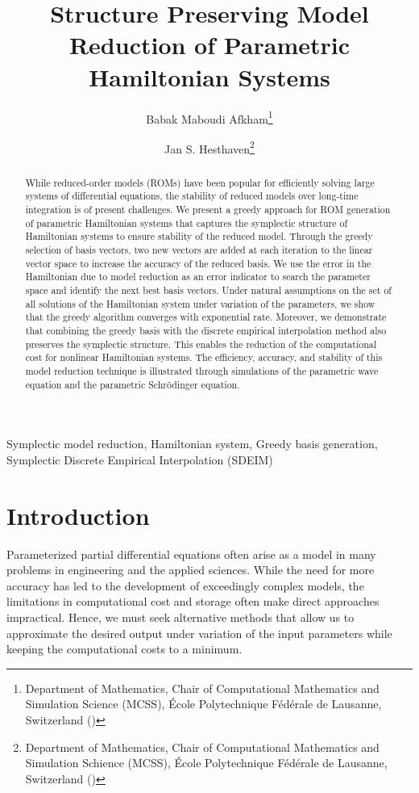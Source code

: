 \documentclass[final]{siamart}
\title{Structure Preserving Model Reduction of Parametric Hamiltonian Systems}
\author{
	Babak Maboudi Afkham\thanks{Department of Mathematics, Chair of Computational Mathematics and Simulation Science (MCSS), \'Ecole Polytechnique F\'ed\'erale de Lausanne, Switzerland (\email{babak.maboudi@epfl.ch})} 
	\and 
	Jan S. Hesthaven\thanks{Department of Mathematics, Chair of Computational Mathematics and Simulation Schience (MCSS), \'Ecole Polytechnique F\'ed\'erale de Lausanne, Switzerland (\email{jan.hesthaven@epfl.ch})}}
\begin{document}
\maketitle

\begin{abstract}
While reduced-order models (ROMs) {{\color{black}} have been} popular for {{\color{black}} efficiently} solving large systems of differential equations, the stability of reduced models over long-time integration {{\color{black}} is of present challenges}. We present a greedy approach for ROM generation of parametric Hamiltonian systems {{\color{black}} that} captures the symplectic structure of Hamiltonian systems to ensure stability of the reduced model. Through the greedy selection of basis vectors, {{\color{black}} two new vectors are added at each iteration to the linear vector space} to increase the accuracy of the {{\color{black}} reduced} basis. We {{\color{black}} use} the error in the Hamiltonian due to model reduction as an error indicator to search the parameter space and identify the next best basis vectors. Under natural assumptions on the set of all solutions of the Hamiltonian system under variation of the parameters, we show that the greedy algorithm converges with exponential rate. Moreover, we demonstrate that combining the greedy basis with the discrete empirical interpolation method also preserves the symplectic structure. This enables the reduction of the computational cost for nonlinear Hamiltonian systems. The efficiency, accuracy, and stability of this model reduction technique is illustrated through simulations of the parametric wave equation and the parametric Schr\"odinger equation.
\end{abstract}

\begin{keywords}
  Symplectic model reduction, Hamiltonian system, Greedy basis generation, Symplectic Discrete Empirical Interpolation (SDEIM)
\end{keywords}

\begin{AMS}

\end{AMS}

\section{Introduction}
{{\color{black}} Parameterized partial differential equations often arise as a model in many problems in engineering and the applied sciences}. While the need for more accuracy has led to the development of exceedingly complex models, the {{\color{black}} limitations in computational cost and storage} often make direct approaches {{\color{black}} impractical}. Hence, we must seek alternative methods that allow us to approximate the desired output under variation of the input parameters while keeping the computational costs to a minimum.
\end{document}
